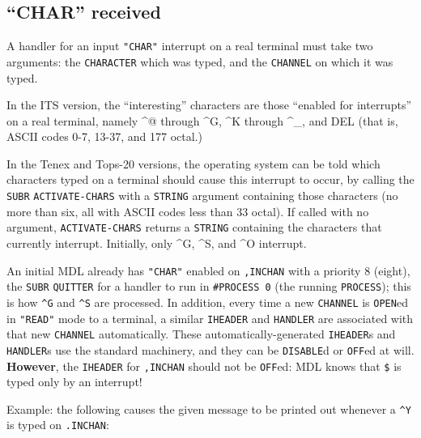 \documentclass[a4paper]{scrbook}
\begin{document}
\subsection{\texorpdfstring{``CHAR'' received}{21.8.1. CHAR received}}\label{char-received}

A handler for an input \texttt{"CHAR"} interrupt on a real terminal must take two arguments: the \texttt{CHARACTER} which
was typed, and the \texttt{CHANNEL} on which it was typed.

In the ITS version, the ``interesting'' characters are those ``enabled for interrupts'' on a real
terminal, namely \^{}@ through \^{}G, \^{}K through \^{}\_, and DEL (that is, ASCII codes 0-7,
13-37, and 177 octal.)

In the Tenex and Tops-20 versions, the operating system can be told which
characters typed on a terminal should cause this interrupt to occur, by calling the \texttt{SUBR} \texttt{ACTIVATE-CHARS}
 with a \texttt{STRING} argument containing those characters (no more than six, all
with ASCII codes less than 33 octal). If called with no argument, \texttt{ACTIVATE-CHARS} returns a \texttt{STRING}
containing the characters that currently interrupt. Initially, only \^{}G, \^{}S, and \^{}O
interrupt.

An initial MDL already has \texttt{"CHAR"} enabled on \texttt{,INCHAN} with a priority 8 (eight), the \texttt{SUBR}
\texttt{QUITTER} for a handler to run in \texttt{\#PROCESS\ 0} (the running
\texttt{PROCESS}); this is how \texttt{\^{}G} and \texttt{\^{}S} are processed. In addition, every time a new
\texttt{CHANNEL} is \texttt{OPEN}ed in \texttt{"READ"}  mode to a terminal, a
similar \texttt{IHEADER} and \texttt{HANDLER} are associated with that new \texttt{CHANNEL}
automatically. These automatically-generated \texttt{IHEADER}s and \texttt{HANDLER}s use the standard machinery, and they
can be \texttt{DISABLE}d or \texttt{OFF}ed at will. \textbf{However}, the \texttt{IHEADER} for \texttt{,INCHAN} should not
be \texttt{OFF}ed: MDL knows that \texttt{\$}  is typed only by an interrupt!

Example: the following causes the given message to be printed out whenever a \texttt{\^{}Y} is typed on \texttt{.INCHAN}:
\end{document}
